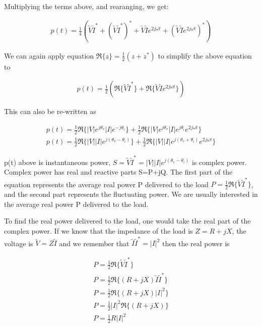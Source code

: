 \documentclass{ximera}
\begin{document}
Multiplying the terms above, and rearanging, we get:


\begin{eqnarray}
p(t)=\frac{1}{4} (\tilde{V}\tilde{I}^*+ (\tilde{V}\tilde{I}^*)^*+ \tilde{V}\tilde{I} e^{2j \omega t}+ (\tilde{V}\tilde{I} e^{2j \omega t})^*)
\end{eqnarray}

We can again apply equation $\Re\{z\}=\frac{1}{2}(z +z^*)$ to simplify the above equation to

\begin{eqnarray}
p(t)=\frac{1}{2} (\Re\{\tilde{V}\tilde{I}^*\}+ \Re\{\tilde{V}\tilde{I} e^{2j \omega t }\})
\end{eqnarray}

This can also be re-written as

\begin{eqnarray}
p(t)=\frac{1}{2} \Re\{ |V| e^{j\theta_v} |I| e^{-j\theta_i} \}+ \frac{1}{2} \Re\{|V| e^{j\theta_v} |I| e^{j\theta_i} e^{2j \omega t }\} \\
p(t)=\frac{1}{2} \Re\{ |V| |I| e^{j(\theta_v-\theta_i)} \}+ \frac{1}{2} \Re\{|V| |I|  e^{j(\theta_v+\theta_i)}  e^{2j \omega t }\}
\end{eqnarray}


p(t) above is instantaneous power, $S=\tilde{V}\tilde{I}^*=|V| |I| e^{j(\theta_v-\theta_i)}$ is complex power. Complex power has real and reactive parts S=P+jQ. The first part of the equation represents the average real power P delivered to the load $P=\frac{1}{2}\Re\{\tilde{V}\tilde{I}^*\}$, and the second part represents the fluctuating power. We are usually interested in the average real power P delivered to the load.

To find the real power delivered to the load, one would take the real part of the complex power. If we know that the impedance of the load is $Z=R+jX$, the voltage is $ \tilde{V} = Z \tilde{I}$ and we remember that $\tilde{I} \tilde{I}^* = |I|^2$ then the real power is

\begin{eqnarray}
P=\frac{1}{2}\Re\{ \tilde{V} \tilde{I}^*  \} \\
P=\frac{1}{2}\Re\{ (R+jX) \tilde{I} \tilde{I}^*  \} \\
P=\frac{1}{2}\Re\{ (R+jX) |I|^2  \} \\
P=\frac{1}{2}|I|^2 \Re\{ (R+jX)   \} \\
P=\frac{1}{2}R |I|^2 
\end{eqnarray}
\end{document}
